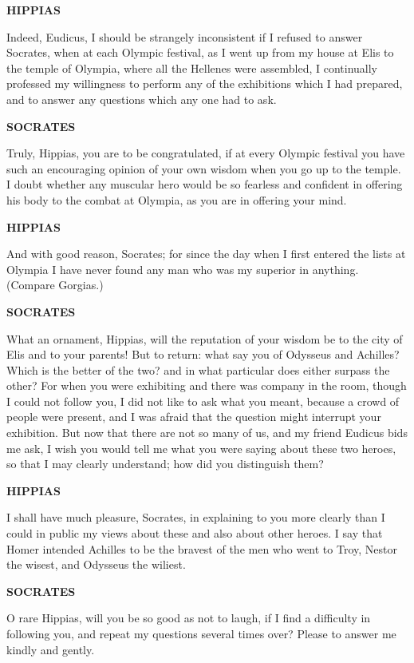 \documentclass[11pt,letter]{article}
\begin{document}
\par \textbf{HIPPIAS}
\par   Indeed, Eudicus, I should be strangely inconsistent if I refused to answer Socrates, when at each Olympic festival, as I went up from my house at Elis to the temple of Olympia, where all the Hellenes were assembled, I continually professed my willingness to perform any of the exhibitions which I had prepared, and to answer any questions which any one had to ask.

\par \textbf{SOCRATES}
\par   Truly, Hippias, you are to be congratulated, if at every Olympic festival you have such an encouraging opinion of your own wisdom when you go up to the temple. I doubt whether any muscular hero would be so fearless and confident in offering his body to the combat at Olympia, as you are in offering your mind.

\par \textbf{HIPPIAS}
\par   And with good reason, Socrates; for since the day when I first entered the lists at Olympia I have never found any man who was my superior in anything. (Compare Gorgias.)

\par \textbf{SOCRATES}
\par   What an ornament, Hippias, will the reputation of your wisdom be to the city of Elis and to your parents! But to return:  what say you of Odysseus and Achilles? Which is the better of the two? and in what particular does either surpass the other? For when you were exhibiting and there was company in the room, though I could not follow you, I did not like to ask what you meant, because a crowd of people were present, and I was afraid that the question might interrupt your exhibition. But now that there are not so many of us, and my friend Eudicus bids me ask, I wish you would tell me what you were saying about these two heroes, so that I may clearly understand; how did you distinguish them?

\par \textbf{HIPPIAS}
\par   I shall have much pleasure, Socrates, in explaining to you more clearly than I could in public my views about these and also about other heroes. I say that Homer intended Achilles to be the bravest of the men who went to Troy, Nestor the wisest, and Odysseus the wiliest.

\par \textbf{SOCRATES}
\par   O rare Hippias, will you be so good as not to laugh, if I find a difficulty in following you, and repeat my questions several times over? Please to answer me kindly and gently.
\end{document}
